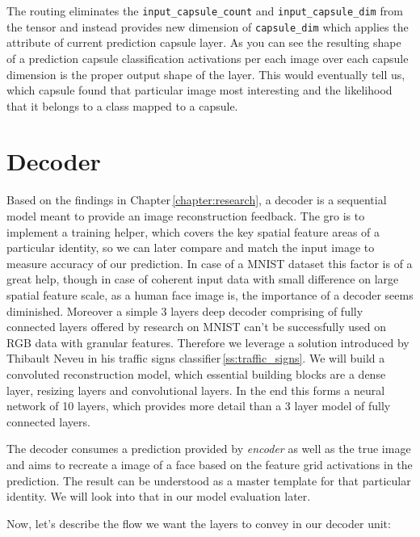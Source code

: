 The routing eliminates the \texttt{input\_capsule\_count} and \texttt{input\_capsule\_dim} from the tensor and instead provides new dimension of \texttt{capsule\_dim} which applies the attribute of current prediction capsule layer. As you can see the resulting shape of a prediction capsule classification activations per each image over each capsule dimension is the proper output shape of the layer. This would eventually tell us, which capsule found that particular image most interesting and the likelihood that it belongs to a class mapped to a capsule.

\section{Decoder}

Based on the findings in Chapter\,\ref{chapter:research}, a decoder is a sequential model meant to provide an image reconstruction feedback. The gro is to implement a training helper, which covers the key spatial feature areas of a particular identity, so we can later compare and match the input image to measure accuracy of our prediction. In case of a MNIST dataset this factor is of a great help, though in case of coherent input data with small difference on large spatial feature scale, as a human face image is, the importance of a decoder seems diminished. Moreover a simple 3 layers deep decoder comprising of fully connected layers offered by research on MNIST can't be successfully used on RGB data with granular features. Therefore we leverage a solution introduced by Thibault Neveu in his traffic signs classifier\,\ref{ss:traffic_signs}. We will build a convoluted reconstruction model, which essential building blocks are a dense layer, resizing layers and convolutional layers. In the end this forms a neural network of 10 layers, which provides more detail than a 3 layer model of fully connected layers.

The decoder consumes a prediction provided by \textit{encoder} as well as the true image and aims to recreate a image of a face based on the feature grid activations in the prediction. The result can be understood as a master template for that particular identity. We will look into that in our model evaluation later.

Now, let's describe the flow we want the layers to convey in our decoder unit:

